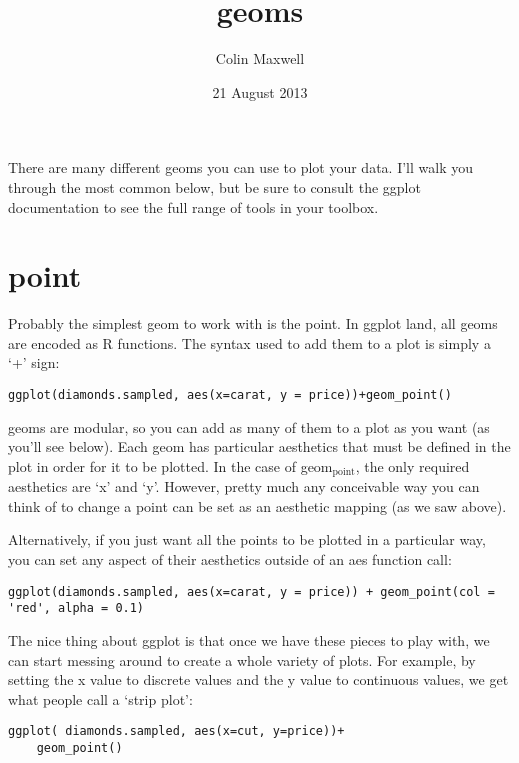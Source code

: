 \documentclass[11pt]{article}
\title{geoms}
\author{Colin Maxwell}
\date{21 August 2013}
\begin{document}
\maketitle

\setcounter{tocdepth}{3}
\tableofcontents
\vspace*{1cm}

There are many different geoms you can use to plot your data. I'll
walk you through the most common below, but be sure to consult the
ggplot documentation to see the full range of tools in your toolbox.

\section{point}
\label{sec-1}


Probably the simplest geom to work with is the point. In ggplot land,
all geoms are encoded as R functions. The syntax used to add them to a
plot is simply a `+' sign:

\begin{verbatim}
ggplot(diamonds.sampled, aes(x=carat, y = price))+geom_point()
\end{verbatim}


geoms are modular, so you can add as many of them to a plot as you
want (as you'll see below). Each geom has particular aesthetics that
must be defined in the plot in order for it to be plotted. In the case
of geom$_{\mathrm{point}}$, the only required aesthetics are `x' and `y'. However,
pretty much any conceivable way you can think of to change a point can
be set as an aesthetic mapping (as we saw above).

Alternatively, if you just want all the points to be plotted in a
particular way, you can set any aspect of their aesthetics outside of
an aes function call:

\begin{verbatim}
ggplot(diamonds.sampled, aes(x=carat, y = price)) + geom_point(col = 'red', alpha = 0.1)
\end{verbatim}


The nice thing about ggplot is that once we have these pieces to play
with, we can start messing around to create a whole variety of plots.
For example, by setting the x value to discrete values and the y value to
continuous values, we get what people call a `strip plot':

\begin{verbatim}
ggplot( diamonds.sampled, aes(x=cut, y=price))+
    geom_point()
\end{verbatim}
\end{document}
